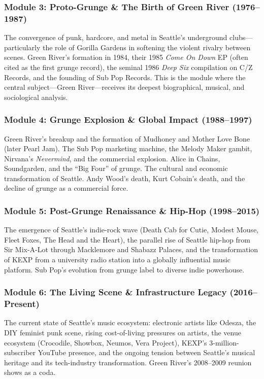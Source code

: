 \documentclass[11pt,letterpaper]{article}
\begin{document}
\subsubsection{Module 3: Proto-Grunge \& The Birth of Green River (1976--1987)}
The convergence of punk, hardcore, and metal in Seattle's underground clubs---particularly the role of Gorilla Gardens in softening the violent rivalry between scenes. Green River's formation in 1984, their 1985 \textit{Come On Down} EP (often cited as the first grunge record), the seminal 1986 \textit{Deep Six} compilation on C/Z Records, and the founding of Sub Pop Records. This is the module where the central subject---Green River---receives its deepest biographical, musical, and sociological analysis.

\subsubsection{Module 4: Grunge Explosion \& Global Impact (1988--1997)}
Green River's breakup and the formation of Mudhoney and Mother Love Bone (later Pearl Jam). The Sub Pop marketing machine, the Melody Maker gambit, Nirvana's \textit{Nevermind}, and the commercial explosion. Alice in Chains, Soundgarden, and the ``Big Four'' of grunge. The cultural and economic transformation of Seattle. Andy Wood's death, Kurt Cobain's death, and the decline of grunge as a commercial force.

\subsubsection{Module 5: Post-Grunge Renaissance \& Hip-Hop (1998--2015)}
The emergence of Seattle's indie-rock wave (Death Cab for Cutie, Modest Mouse, Fleet Foxes, The Head and the Heart), the parallel rise of Seattle hip-hop from Sir Mix-A-Lot through Macklemore and Shabazz Palaces, and the transformation of KEXP from a university radio station into a globally influential music platform. Sub Pop's evolution from grunge label to diverse indie powerhouse.

\subsubsection{Module 6: The Living Scene \& Infrastructure Legacy (2016--Present)}
The current state of Seattle's music ecosystem: electronic artists like Odesza, the DIY feminist punk scene, rising cost-of-living pressures on artists, the venue ecosystem (Crocodile, Showbox, Neumos, Vera Project), KEXP's 3-million-subscriber YouTube presence, and the ongoing tension between Seattle's musical heritage and its tech-industry transformation. Green River's 2008--2009 reunion shows as a coda.
\end{document}
